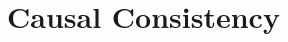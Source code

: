 \documentclass[12pt]{beamer}
\newcommand{\bi}{\begin{enumerate}[$\bullet$]}
\newcommand{\ei}{\end{enumerate}}
\begin{document}
%

\section{Causal Consistency}

\newcommand{\trace}{\rho}
\newcommand{\etrace}{\varepsilon}

\newcommand{\causeq}{\asymp}
\newcommand{\nottrace}[1]{{#1}_\bullet}
\newcommand{\tsource}[1]{\mathtt{src}(#1)}
\newcommand{\ttarget}[1]{\mathtt{trg}(#1)}
\end{document}
